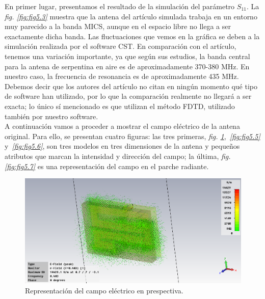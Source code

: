En primer lugar, presentamos el resultado de la simulación del parámetro $S_{11}$. La \textit{fig. \ref{fig:fig5.3}} muestra que la antena del artículo simulada trabaja en un entorno muy parecido a la banda MICS, aunque en el espacio libre no llega a ser exactamente dicha banda. Las fluctuaciones que vemos en la gráfica se deben a la simulación realizada por el software CST. En comparación con el artículo, tenemos una variación importante, ya que según sus estudios, la banda central para la antena de serpentina en aire es de aproximadamente 370-380 MHz. En nuestro caso, la frecuencia de resonancia es de aproximadamente 435 MHz. Debemos decir que los autores del artículo no citan en ningún momento qué tipo de software han utilizado, por lo que la comparación realmente no llegará a ser exacta; lo único sí mencionado es que utilizan el método FDTD, utilizado también por nuestro software.\\

A continuación vamos a proceder a mostrar el campo eléctrico de la antena original. Para ello, se presentan cuatro figuras: las tres primeras, \textit{fig. \ref{fig:fig5.4}},~\textit{\ref{fig:fig5.5}} y~\textit{\ref{fig:fig5.6}}, son tres modelos en tres dimensiones de la antena y pequeños atributos que marcan la intensidad y dirección del campo; la última, \textit{fig. \ref{fig:fig5.7}} es una representación del campo en el parche radiante.

\begin{figure}[!htb]
    \centering
    \includegraphics[scale=0.3]{./Simulaciones/original_antenna/original_antenna_E-Field}
    \caption{Representación del campo eléctrico en prespectiva.}
    \label{fig:fig5.4}
\end{figure}

